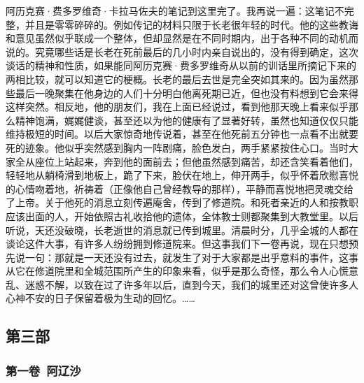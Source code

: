 \par 阿历克赛·费多罗维奇·卡拉马佐夫的笔记到这里完了。我再说一遍：这笔记不完整，并且是零零碎碎的。例如传记的材料只限于长老很年轻的时代。他的这些教诲和意见虽然似乎联成一个整体，但却显然是在不同时期内，出于各种不同的动机而说的。究竟哪些话是长老在死前最后的几小时内亲自说出的，没有得到确定，这次谈话的精神和性质，如果能同阿历克赛·费多罗维奇从以前的训话里所摘记下来的两相比较，就可以知道它的梗概。长老的最后去世是完全突如其来的。因为虽然那些最后一晚聚集在他身边的人们十分明白他离死期已近，但也没有料想到它会来得这样突然。相反地，他的朋友们，我在上面已经说过，看到他那天晚上看来似乎那么精神饱满，娓娓健谈，甚至还以为他的健康有了显著好转，虽然也知道仅仅只能维持极短的时间。以后大家惊奇地传说着，甚至在他死前五分钟也一点看不出就要死的迹象。他似乎突然感到胸内一阵剧痛，脸色发白，两手紧紧按住心口。当时大家全从座位上站起来，奔到他的面前去；但他虽然感到痛苦，却还含笑看着他们，轻轻地从躺椅滑到地板上，跪了下来，脸伏在地上，伸开两手，似乎怀着欣慰喜悦的心情吻着地，祈祷着（正像他自己曾经教导的那样），平静而喜悦地把灵魂交给了上帝。关于他死的消息立刻传遍庵舍，传到了修道院。和死者亲近的人和按教职应该出面的人，开始依照古礼收拾他的遗体，全体教士则都聚集到大教堂里。以后听说，天还没破晓，长老逝世的消息就已传到城里。清晨时分，几乎全城的人都在谈论这件大事，有许多人纷纷拥到修道院来。但这事我们下一卷再说，现在只想预先说一句：那就是一天还没有过去，就发生了对于大家都是出乎意料的事件，这事从它在修道院里和全城范围所产生的印象来看，似乎是那么奇怪，那么令人心慌意乱、迷惑不解，以致在过了许多年以后，直到今天，我们的城里还对这曾使许多人心神不安的日子保留着极为生动的回忆。……








\subsection*{第三部}


\subsubsection*{第一卷\ 阿辽沙}


